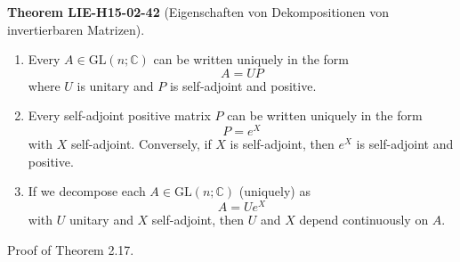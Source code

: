 \documentclass[10pt, letterpaper]{article}
\newcommand{\CustomHeading}[3]{%
  \par\medskip\noindent%
  \textbf{#1 #2} \textnormal{(#3)}.\enskip%
}
\newenvironment{THEO}[2]{\begin{unitbox}\CustomHeading{Theorem}{#1}{#2}}{\end{unitbox}}
\begin{document}
\begin{THEO}{LIE-H15-02-42}{Eigenschaften von Dekompositionen von invertierbaren Matrizen}
\begin{enumerate}
  \item Every $A \in \mathrm{GL}(n ; \mathbb{C})$ can be written uniquely in the form
    $$
    A=U P
    $$
    where $U$ is unitary and $P$ is self-adjoint and positive.
    
    \item Every self-adjoint positive matrix $P$ can be written uniquely in the form
    $$
    P=e^{X}
    $$
    with $X$ self-adjoint. Conversely, if $X$ is self-adjoint, then $e^{X}$ is self-adjoint and positive.

    \item If we decompose each $A \in \mathrm{GL}(n ; \mathbb{C})$ (uniquely) as
    $$
    A=U e^{X}
    $$
    with $U$ unitary and $X$ self-adjoint, then $U$ and $X$ depend continuously on $A$.
\end{enumerate}
\end{THEO}

Proof of Theorem 2.17. 
\end{document}
